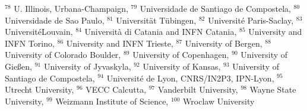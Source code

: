 {$^{78}$ U. Illinois, Urbana-Champaign, 
$^{79}$ Universidade de Santiago de Compostela, 
$^{80}$ Universidade de Sao Paulo, 
$^{81}$ Universit\"{a}t T\"{u}bingen, 
$^{82}$ Universit\'e Paris-Saclay, 
$^{83}$ Universit\'{e}Louvain, 
$^{84}$ Universit\`a di Catania and INFN Catania, 
$^{85}$ University and INFN Torino, 
$^{86}$ University and INFN Trieste, 
$^{87}$ University of Bergen, 
$^{88}$ University of Colorado Boulder, 
$^{89}$ University of Copenhagen, 
$^{90}$ University of Gie{\ss}en, 
$^{91}$ University of Jyvaskyla, 
$^{92}$ University of Kansas, 
$^{93}$ University of Santiago de Compostela, 
$^{94}$ Universit{\'e} de Lyon, CNRS/IN2P3, IPN-Lyon, 
$^{95}$ Utrecht University, 
$^{96}$ VECC Calcutta, 
$^{97}$ Vanderbilt University, 
$^{98}$ Wayne State University, 
$^{99}$ Weizmann Institute of Science, 
$^{100}$ Wroclaw University
}

